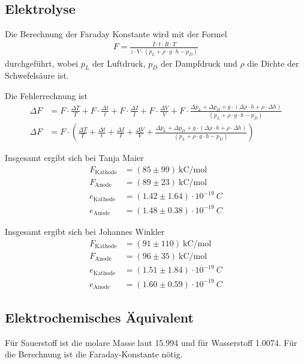 \documentclass{article}
\begin{document}
\subsection{Elektrolyse}


Die Berechnung der Faraday Konstante wird mit der Formel
\begin{align}
F = \frac{I\cdot t\cdot R \cdot T}{z \cdot V \cdot (p_L +\rho \cdot g \cdot h - p_D)}
\end{align}
durchgeführt, wobei $p_L$ der Luftdruck, $p_D$ der Dampfdruck und $\rho$ die Dichte der Schwefelsäure ist.

Die Fehlerrechnung ist
\begin{align*}
\Delta F &= F\cdot \frac{\Delta T}{T} + F\cdot \frac{\Delta t}{t} + F\cdot \frac{\Delta I}{I} + F \cdot \frac{\Delta V}{V}  + F\cdot \frac{\Delta p_L + \Delta p_D + g\cdot (\Delta\rho \cdot h + \rho\cdot \Delta h)}{(p_L +\rho \cdot g \cdot h - p_D)}\\
\Delta F &= F\cdot \left(\frac{\Delta T}{T} + \frac{\Delta t}{t} + \frac{\Delta I}{I} + \frac{\Delta V}{V}  + \frac{\Delta p_L + \Delta p_D + g\cdot (\Delta\rho \cdot h + \rho\cdot \Delta h)}{(p_L +\rho \cdot g \cdot h - p_D)}\right)
\end{align*}


Insgesamt ergibt sich bei Tanja Maier
\begin{align*}
F_\text{Kathode} &= (85 \pm 99)~\text{kC/mol}\\
F_\text{Anode} &= (89 \pm 23)~\text{kC/mol} \\
e_\text{Kathode} &= (1.42 \pm 1.64)\cdot 10^{-19}~C \\
e_\text{Anode} &= (1.48 \pm 0.38)\cdot 10^{-19}~C  
\end{align*}

Insgesamt ergibt sich bei Johannes Winkler
\begin{align*}
F_\text{Kathode} &= (91 \pm 110)~\text{kC/mol}\\
F_\text{Anode} &= (96 \pm 35)~\text{kC/mol} \\
e_\text{Kathode} &= (1.51 \pm 1.84)\cdot 10^{-19}~C \\
e_\text{Anode} &= (1.60 \pm 0.59)\cdot 10^{-19}~C  
\end{align*}


\subsection{Elektrochemisches Äquivalent}

Für Sauerstoff ist die molare Masse laut \cite{equiv} 15.994 und für Wasserstoff 1.0074. Für die Berechnung ist die Faraday-Konstante nötig.
\end{document}

